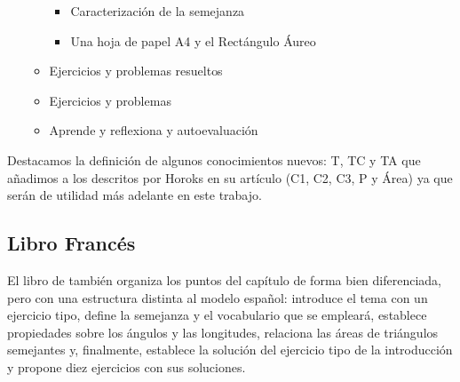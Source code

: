 \begin{itemize}
\begin{itemize}
			\begin{itemize}
				\item[\textbullet] Caracterización de la semejanza
				\item[\textbullet] Una hoja de papel A4 y el Rectángulo Áureo
			\end{itemize}
			\item[\ding{43}] Ejercicios y problemas resueltos
			\item[\ding{43}] Ejercicios y problemas
			\item[\ding{43}] Aprende y reflexiona y autoevaluación
		\end{itemize}
	\end{itemize}
	
	Destacamos la definición de algunos conocimientos nuevos: T, TC y TA que añadimos a los descritos por Horoks en su artículo (C1, C2, C3, P y Área) ya que serán de utilidad más adelante en este trabajo.
	
\subsection{Libro Francés}
	
	El libro de \citet{fr} también organiza los puntos del capítulo de forma bien diferenciada, pero con una estructura distinta al modelo español: introduce el tema con un ejercicio tipo, define la semejanza y el vocabulario que se empleará, establece propiedades sobre los ángulos y las longitudes, relaciona las áreas de triángulos semejantes y, finalmente, establece la solución del ejercicio tipo de la introducción y propone diez ejercicios con sus soluciones.
	
